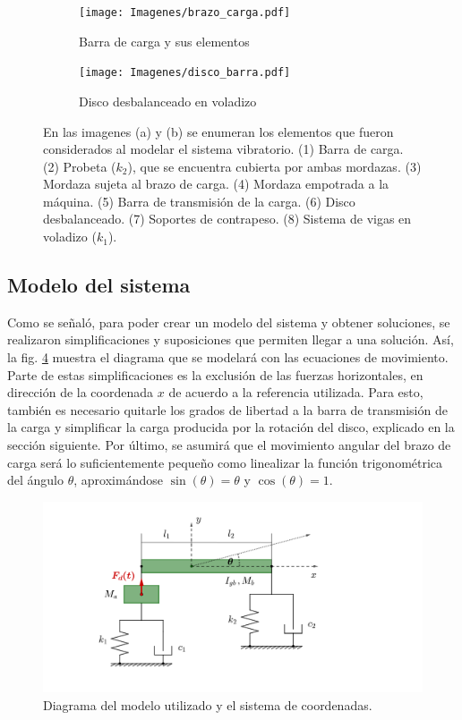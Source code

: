 \begin{figure}[p]
\centering
	\begin{subfigure}{1\linewidth}
		\centering
		\texttt{[image: Imagenes/brazo\_carga.pdf]}
		\caption{Barra de carga y sus elementos}\label{fig:elementos_brazo}
	\end{subfigure}
	\begin{subfigure}{1\linewidth}
		\centering
		\texttt{[image: Imagenes/disco\_barra.pdf]}
		\caption{Disco desbalanceado en voladizo}\label{fig:elementos_disco}
	\end{subfigure}
\caption{En las imagenes (a) y (b) se enumeran los elementos que fueron considerados al modelar el sistema vibratorio. (1) Barra de carga. (2) Probeta ($k_2$), que se encuentra cubierta por ambas mordazas. (3) Mordaza sujeta al brazo de carga. (4) Mordaza empotrada a la máquina. (5) Barra de transmisión de la carga. (6) Disco desbalanceado. (7) Soportes de contrapeso. (8) Sistema de vigas en voladizo ($k_1$).}
\label{fig:elementos_modelo}
\end{figure}

\subsection{Modelo del sistema}
\label{sec:mod_sist}
Como se señaló, para poder crear un modelo del sistema y obtener soluciones, se realizaron simplificaciones y suposiciones que permiten llegar a una solución. Así, la fig. \ref{fig:diag_modelo} muestra el diagrama que se modelará con las ecuaciones de movimiento. Parte de estas simplificaciones es la exclusión de las fuerzas horizontales, en dirección de la coordenada $x$ de acuerdo a la referencia utilizada. Para esto, también es necesario quitarle los grados de libertad a la barra de transmisión de la carga y simplificar la carga producida por la rotación del disco, explicado en la sección siguiente. Por último, se asumirá que el movimiento angular del brazo de carga será lo suficientemente pequeño como linealizar la función trigonométrica del ángulo $\theta$, aproximándose $\sin(\theta) = \theta$ y $\cos(\theta)=1$.

\begin{figure}[h]
\centering
\includegraphics[width=0.9\linewidth, trim={5cm 2cm 10cm 1cm}, clip]{Imagenes/mach_diag.pdf}
\caption{Diagrama del modelo utilizado y el sistema de coordenadas.}
\label{fig:diag_modelo}
\end{figure}

